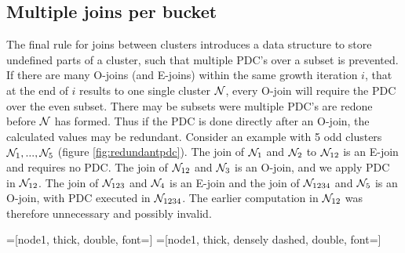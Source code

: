 \subsection{Multiple joins per bucket}\label{sec:multiplejoint}

The final rule for joins between clusters introduces a data structure to store undefined parts of a cluster, such that multiple PDC's over a subset is prevented. If there are many O-joins (and E-joins) within the same growth iteration $i$, that at the end of $i$ results to one single cluster $\mathcal{N}$, every O-join will require the PDC over the even subset. There may be subsets were multiple PDC's are redone before $\mathcal{N}$ has formed. Thus if the PDC is done directly after an O-join, the calculated values may be redundant. Consider an example with 5 odd clusters $\mathcal{N}_1, ...,  \mathcal{N}_5$ (figure \ref{fig:redundantpdc}). The join of $\mathcal{N}_1$ and $\mathcal{N}_2$ to $\mathcal{N}_{12}$ is an E-join and requires no PDC. The join of $\mathcal{N}_{12}$ and $\mathcal{N}_3$ is an O-join, and we apply PDC in $\mathcal{N}_{12}$. The join of $\mathcal{N}_{123}$ and $\mathcal{N}_4$ is an E-join and the join of $\mathcal{N}_{1234}$ and $\mathcal{N}_5$ is an O-join, with PDC executed in $\mathcal{N}_{1234}$. The earlier computation in $\mathcal{N}_{12}$ was therefore unnecessary and possibly invalid.

=[node1, thick, double, font=\footnotesize]
=[node1, thick, densely dashed, double, font=\footnotesize]

